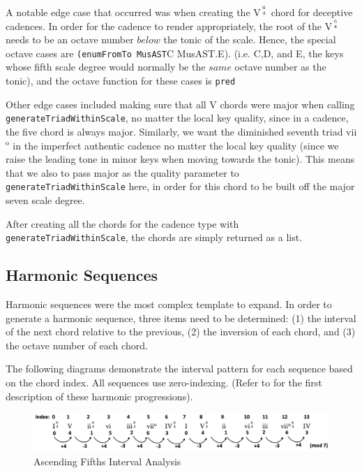 \documentclass{report}
\begin{document}
A notable edge case that occurred was when creating the V$^{6 \atop 4}$ chord for deceptive cadences. In order for the cadence to render appropriately, the root of the V$^{6 \atop 4}$ needs to be an octave number $below$ the tonic of the scale. Hence, the special octave cases are \verb.(enumFromTo MusAST.C MusAST.E). (i.e. C,D, and E, the keys whose  fifth scale degree would normally be the $same$ octave number as the tonic), and the octave function for these cases is  \verb.pred.

Other edge cases included making sure that all V chords were major when calling \\\verb.generateTriadWithinScale., no matter the local key quality, since in a cadence, the five chord is always major. Similarly, we want the diminished seventh triad vii$^\text{o}$ in the imperfect authentic cadence no matter the local key quality (since we raise the leading tone in minor keys when moving towards the tonic). This means that  we also to pass major as the quality parameter to \verb.generateTriadWithinScale. here, in order for this chord to be built off the major seven scale degree.

After creating all the chords for the cadence  type with  \verb.generateTriadWithinScale., the chords are simply returned as a list.

\subsection{Harmonic Sequences}
Harmonic sequences were the most complex template to expand. In order to generate a harmonic sequence, three items need to be determined: (1) the interval of the next chord relative to the previous, (2) the inversion of each chord, and (3) the octave number of each chord.

The following diagrams demonstrate the interval pattern for each sequence based on the chord index. All sequences use zero-indexing.  (Refer to  for the first description of these harmonic progressions).

\begin{figure}[h!]
\centering
\includegraphics[width=\textwidth]{images/asc_fifths_intervals}
  \caption{Ascending Fifths Interval Analysis}
\end{figure}
\end{document}
